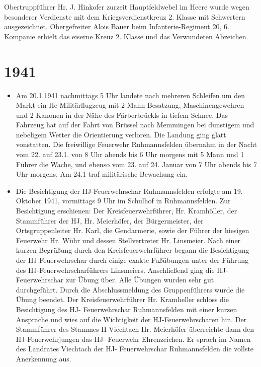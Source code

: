 \documentclass[12pt,a4paper]{book}
\begin{document}
Obertruppführer Hr. J. Hinkofer zurzeit Hauptfeldwebel im Heere wurde wegen
besonderer Verdienste mit dem Kriegsverdienstkreuz 2. Klasse mit Schwertern
ausgezeichnet. Obergefreiter Alois Bauer beim Infanterie-Regiment 20, 6.
Kompanie erhielt das eiserne Kreuz 2. Klasse und das Verwundeten Abzeichen.

\section*{1941}

\begin{itemize}
\item Am 20.1.1941 nachmittags 5 Uhr landete nach mehreren Schleifen um den
Markt ein He-Militärflugzeug mit 2 Mann Besatzung, Maschinengewehren und 2
Kanonen in der Nähe des Färberbrückls in tiefem Schnee. Das Fahrzeug hat auf der
Fahrt von Brüssel nach Memmingen bei dunstigem und nebeligem Wetter die
Orientierung verloren. Die Landung ging glatt vonstatten. Die freiwillige
Feuerwehr Ruhmannsfelden übernahm in der Nacht vom 22. auf 23.1. von 8 Uhr
abends bis 6 Uhr morgens mit 5 Mann und 1 Führer die Wache, und ebenso vom 23.
auf 24. Januar von 7 Uhr abends bis 7 Uhr morgens. Am 24.1 traf militärische
Bewachung ein.

\item Die Besichtigung der HJ-Feuerwehrschar Ruhmannsfelden erfolgte am 19.
Oktober 1941, vormittags 9 Uhr im Schulhof in Ruhmannsfelden. Zur Besichtigung
erschienen: Der Kreisfeuerwehrführer, Hr. Kramhöller, der Stammführer der HJ,
Hr. Meierhöfer, der Bürgermeister, der Ortsgruppenleiter Hr. Karl, die
Gendarmerie, sowie der Führer der hiesigen Feuerwehr Hr. Wühr und dessen
Stellvertreter Hr. Linsmeier. Nach einer kurzen Begrüßung durch den
Kreisfeuerwehrführer begann die Besichtigung der HJ-Feuerwehrschar durch einige
exakte Fußübungen unter der Führung des HJ-Feuerwehrscharführers Linsmeiers.
Anschließend ging die HJ- Feuerwehrschar zur Übung über. Alle Übungen wurden
sehr gut durchgeführt. Durch die Abschlussmeldung des Gruppenführers wurde die
Übung beendet. Der Kreisfeuerwehrführer Hr. Kramheller schloss die Besichtigung
des HJ- Feuerwehrschar Ruhmannsfelden mit einer kurzen Ansprache und wies auf
die Wichtigkeit der HJ-Feuerwehrscharen hin. Der Stammführer des Stammes II
Viechtach Hr. Meierhöfer überreichte dann den HJ-Feuerwehrjungen das HJ-
Feuerwehr Ehrenzeichen. Er sprach im Namen des Landrates Viechtach der HJ-
Feuerwehrschar Ruhmannsfelden die vollste Anerkennung aus.
\end{itemize}
\end{document}
